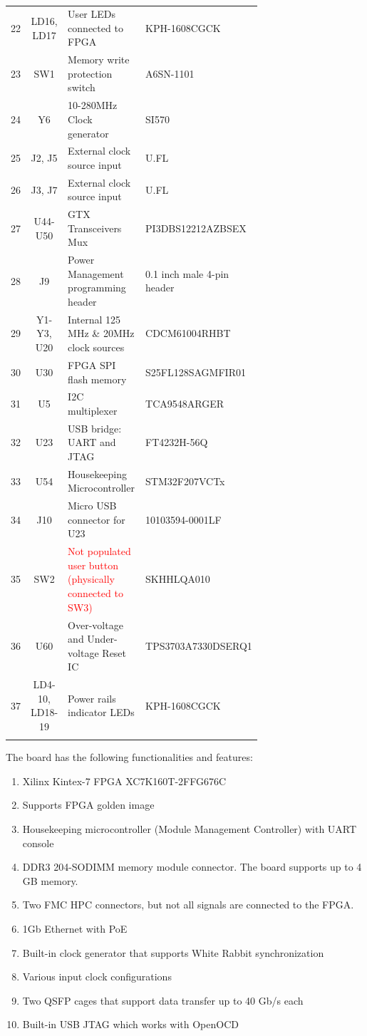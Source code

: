 \documentclass[12pt,oneside,a4]{article}
\begin{document}
\begin{longtable}[htbp]{@{}ccp{0.4\linewidth}p{0.3\linewidth}}
22 & LD16, LD17    & User LEDs connected to FPGA &  KPH-1608CGCK     \\
23 & SW1 & Memory write protection switch  & A6SN-1101 \\
24 & Y6  & 10-280MHz Clock generator   & SI570  \\
25 & J2, J5    & External clock source input & U.FL      \\
26 & J3, J7 &  External clock source input &   U.FL       \\
27 & U44-U50    & GTX Transceivers Mux & PI3DBS12212AZBSEX  \\
28 & J9  & Power Management programming header & 0.1 inch male 4-pin header \\
29 & Y1-Y3, U20 & Internal 125 MHz \& 20MHz clock sources & CDCM61004RHBT \\
30 & U30 &  FPGA SPI flash memory  & S25FL128SAGMFIR01 \\
31 & U5  &  I2C multiplexer    & TCA9548ARGER   \\
32 & U23 &  USB bridge: UART and JTAG & FT4232H-56Q   \\
33 & U54 & Housekeeping Microcontroller  & STM32F207VCTx  \\
34 & J10 & Micro USB connector for U23  & 10103594-0001LF  \\
35 & SW2 & \textcolor{red}{Not populated user button (physically connected to SW3)}  & SKHHLQA010  \\
36 & U60 & Over-voltage and Under-voltage Reset IC & TPS3703A7330DSERQ1 \\
37 & LD4-10, LD18-19 & Power rails indicator LEDs & KPH-1608CGCK \\ \bottomrule

\caption{}
\label{tab:callouts}
\end{longtable}

The board has the following functionalities and features:
\begin{enumerate}
	\item Xilinx Kintex-7 FPGA XC7K160T-2FFG676C
	\item Supports FPGA golden image
	\item Housekeeping microcontroller (Module Management Controller) with UART console
	\item DDR3 204-SODIMM memory module connector. The board supports up to 4 GB memory.
	\item Two FMC HPC connectors, but not all signals are connected to the FPGA.
	\item 1Gb Ethernet with PoE
	\item Built-in clock generator that supports White Rabbit synchronization
	\item Various input clock configurations
	\item Two QSFP cages that support data transfer up to 40 Gb/s each
	\item Built-in USB JTAG which works with OpenOCD
\end{enumerate}
\end{document}
